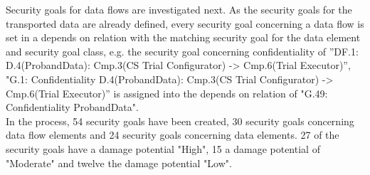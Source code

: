 \newline
Security goals for data flows are investigated next. As the security goals for the transported data are already defined, every security goal concerning a data flow is set in a depends on relation with the matching security goal for the data element and security goal class, e.g. the security goal concerning confidentiality of ”DF.1: D.4(ProbandData): Cmp.3(CS Trial Configurator) -> Cmp.6(Trial Executor)”, "G.1: Confidentiality D.4(ProbandData): Cmp.3(CS Trial Configurator) -> Cmp.6(Trial Executor)” is assigned into the depends on relation of "G.49: Confidentiality ProbandData".\\
\newline
In the process, 54 security goals have been created, 30 security goals concerning data flow elements and 24 security goals concerning data elements. 27 of the security goals have a damage potential "High", 15 a damage potential of "Moderate" and twelve the damage potential "Low".


